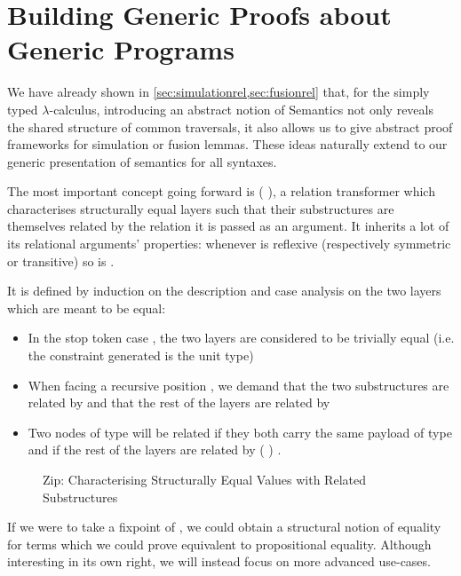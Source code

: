 

\chapter{Building Generic Proofs about Generic Programs}

We have already shown in \cref{sec:simulationrel,sec:fusionrel} that, for the
simply typed $\lambda$-calculus, introducing an abstract notion of Semantics
not only reveals the shared structure of common traversals, it also allows
us to give abstract proof frameworks for simulation or fusion lemmas. These
ideas naturally extend to our generic presentation of semantics for all syntaxes.

\label{def:zipd}
The most important concept going forward is ( ), a relation
transformer which characterises structurally equal layers such that their
substructures are themselves related by the relation it is passed as an
argument. It inherits a lot of its relational arguments' properties: whenever
 is reflexive (respectively symmetric or transitive) so is {  }.\label{lem:zipstable}

It is defined by induction on the description and case analysis on the two
layers which are meant to be equal:
\begin{itemize}
  \item In the stop token case  , the two layers are considered to
    be trivially equal (i.e. the constraint generated is the unit type)
  \item When facing a recursive position { \AB{$\Delta$}  }, we
    demand that the two substructures are related by { \AB{$\Delta$} }
    and that the rest of the layers are related by   
  \item Two nodes of type {  } will
    be related if they both carry the same payload  of type  and if
    the rest of the layers are related by { ( ) }.
\end{itemize}

\begin{figure}[h]
\caption{Zip: Characterising Structurally Equal Values with Related Substructures}
\end{figure}

If we were to take a fixpoint of , we could obtain a structural
notion of equality for terms which we could prove equivalent to propositional
equality. Although interesting in its own right, we will instead focus on more
advanced use-cases.

